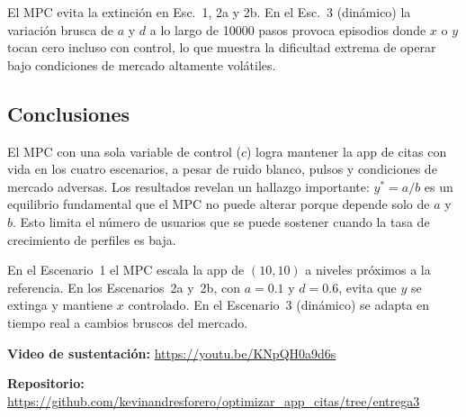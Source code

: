\documentclass[twocolumn,10pt]{article}
\begin{document}
\begin{table}[t]
\centering\footnotesize
\caption{Indicador de extinci\'on ($x\le0$ o $y\le0$ en alg\'un paso).}
\label{tab:ext}
\setlength{\tabcolsep}{2.5pt}
%
\end{table}

El MPC evita la extinci\'on en Esc.\ 1, 2a y 2b. En el Esc.\ 3
(din\'amico) la variaci\'on brusca de $a$ y $d$ a lo largo de
10000 pasos provoca episodios donde $x$ o $y$ tocan cero incluso
con control, lo que muestra la dificultad extrema de operar bajo
condiciones de mercado altamente vol\'atiles.

\subsection*{Conclusiones}

El MPC con una sola variable de control ($c$) logra mantener la
app de citas con vida en los cuatro escenarios, a pesar de ruido
blanco, pulsos y condiciones de mercado adversas. Los resultados
revelan un hallazgo importante: $y^* = a/b$ es un equilibrio
fundamental que el MPC no puede alterar porque depende solo de
$a$ y $b$. Esto limita el n\'umero de usuarios que se puede
sostener cuando la tasa de crecimiento de perfiles es baja.

En el Escenario~1 el MPC escala la app de $(10,10)$ a niveles
pr\'oximos a la referencia. En los Escenarios~2a y~2b, con
$a=0.1$ y $d=0.6$, evita que $y$ se extinga y mantiene $x$
controlado. En el Escenario~3 (din\'amico) se adapta en tiempo
real a cambios bruscos del mercado.

\vspace{1em}
\noindent\small\textbf{Video de sustentaci\'on:}
\url{https://youtu.be/KNpQH0a9d6s}

\noindent\small\textbf{Repositorio:}
\url{https://github.com/kevinandresforero/optimizar_app_citas/tree/entrega3}
\end{document}
